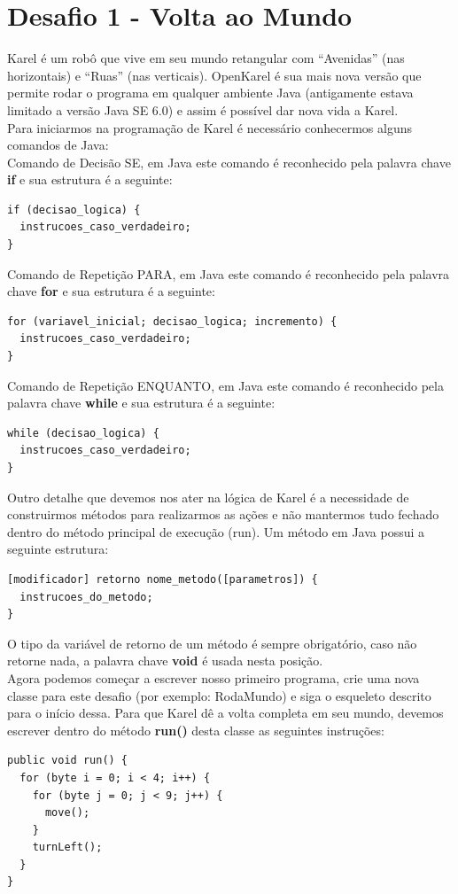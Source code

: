 \documentclass[a4paper,11pt]{article}
\begin{document}
\section{Desafio 1 - Volta ao Mundo}
Karel é um robô que vive em seu mundo retangular com ``Avenidas'' (nas horizontais) e ``Ruas'' (nas verticais). OpenKarel é sua mais nova versão que 
permite rodar o programa em qualquer ambiente Java (antigamente estava limitado a versão Java SE 6.0) e assim é possível dar nova vida a Karel. \\[3mm]
Para iniciarmos na programação de Karel é necessário conhecermos alguns comandos de Java: \\[3mm]
Comando de Decisão SE, em Java este comando é reconhecido pela palavra chave \textbf{if} e sua estrutura é a seguinte:
\begin{lstlisting}
if (decisao_logica) {
  instrucoes_caso_verdadeiro;
}
\end{lstlisting}
Comando de Repetição PARA, em Java este comando é reconhecido pela palavra chave \textbf{for} e sua estrutura é a seguinte:
\begin{lstlisting}
for (variavel_inicial; decisao_logica; incremento) {
  instrucoes_caso_verdadeiro;
}
\end{lstlisting}
Comando de Repetição ENQUANTO, em Java este comando é reconhecido pela palavra chave \textbf{while} e sua estrutura é a seguinte:
\begin{lstlisting}
while (decisao_logica) {
  instrucoes_caso_verdadeiro;
}
\end{lstlisting}
Outro detalhe que devemos nos ater na lógica de Karel é a necessidade de construirmos métodos para realizarmos as ações e não mantermos tudo fechado dentro do método principal de execução (run). Um método em Java possui a seguinte estrutura:
\begin{lstlisting}
[modificador] retorno nome_metodo([parametros]) {
  instrucoes_do_metodo;
}
\end{lstlisting}
O tipo da variável de retorno de um método é sempre obrigatório, caso não retorne nada, a palavra chave \textbf{void} é usada nesta posição. \\[3mm]
Agora podemos começar a escrever nosso primeiro programa, crie uma nova classe para este desafio (por exemplo: RodaMundo) e siga o esqueleto descrito para o início dessa. Para que Karel dê a volta completa em seu mundo, devemos escrever dentro do método \textbf{run()} desta classe as seguintes instruções:
\begin{lstlisting}
public void run() {
  for (byte i = 0; i < 4; i++) {
    for (byte j = 0; j < 9; j++) {
      move();
    }
    turnLeft();
  }
}
\end{lstlisting}
\end{document}

